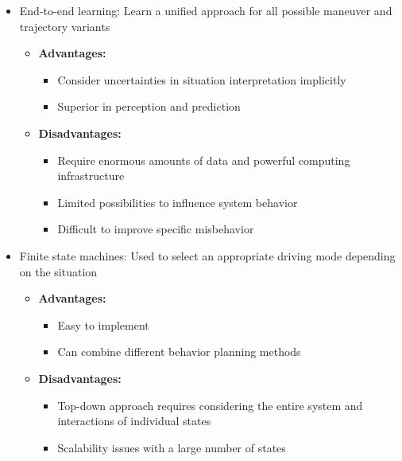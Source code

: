 \begin{itemize}
    \item End-to-end learning: Learn a unified approach for all possible maneuver and trajectory variants \cite{casas_mp3_2021}
          \begin{itemize}
              \item \textbf{Advantages:}
                    \begin{itemize}
                        \item Consider uncertainties in situation interpretation implicitly
                        \item Superior in perception and prediction
                    \end{itemize}
              \item \textbf{Disadvantages:}
                    \begin{itemize}
                        \item Require enormous amounts of data and powerful computing infrastructure
                        \item Limited possibilities to influence system behavior
                        \item Difficult to improve specific misbehavior
                    \end{itemize}
\end{itemize}

\item Finite state machines: Used to select an appropriate driving mode depending on the situation \cite{montemerlo_junior_2008, ziegler_making_2014}
          \begin{itemize}
              \item \textbf{Advantages:}
                    \begin{itemize}
                        \item Easy to implement
                        \item Can combine different behavior planning methods
                    \end{itemize}
              \item \textbf{Disadvantages:}
                    \begin{itemize}
                        \item Top-down approach requires considering the entire system and interactions of individual states
                        \item Scalability issues with a large number of states
                    \end{itemize}
\end{itemize}


\end{itemize}
